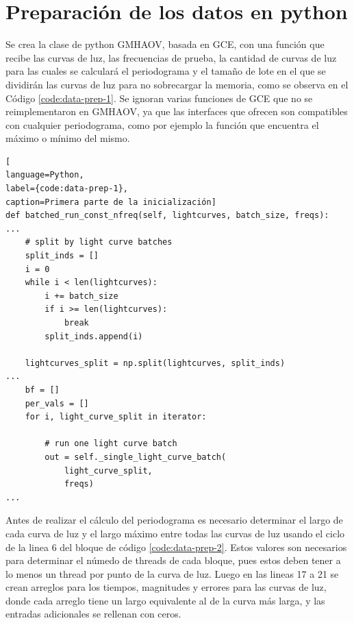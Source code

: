 \section{Preparación de los datos en python}\label{sec:preparacion-datos}
Se crea la clase de python GMHAOV, basada en GCE, con una función que recibe las curvas de luz, las frecuencias de prueba, la cantidad de curvas de luz para las cuales se calculará el periodograma y el tamaño de lote en el que se dividirán las curvas de luz para no sobrecargar la memoria, como se observa en el Código \ref{code:data-prep-1}. Se ignoran varias funciones de GCE que no se reimplementaron en GMHAOV, ya que las interfaces que ofrecen son compatibles con cualquier periodograma, como por ejemplo la función que encuentra el máximo o mínimo del mismo.
\begin{lstlisting}[
language=Python,
label={code:data-prep-1},
caption=Primera parte de la inicialización]
def batched_run_const_nfreq(self, lightcurves, batch_size, freqs):
...
    # split by light curve batches
    split_inds = []
    i = 0
    while i < len(lightcurves):
        i += batch_size
        if i >= len(lightcurves):
            break
        split_inds.append(i)

    lightcurves_split = np.split(lightcurves, split_inds)
...
    bf = []
    per_vals = []
    for i, light_curve_split in iterator:

        # run one light curve batch
        out = self._single_light_curve_batch(
            light_curve_split,
            freqs)
...
\end{lstlisting}

Antes de realizar el cálculo del periodograma es necesario determinar el largo de cada curva de luz y el largo máximo entre todas las curvas de luz usando el ciclo de la linea 6 del bloque de código \ref{code:data-prep-2}.  Estos valores son necesarios para determinar el númedo de threads de cada bloque, pues estos deben tener a lo menos un thread por punto de la curva de luz. Luego en las lineas 17 a 21 se crean arreglos para los tiempos, magnitudes y errores para las curvas de luz, donde cada arreglo tiene un largo equivalente al de la curva más larga, y las entradas adicionales se rellenan con ceros.

